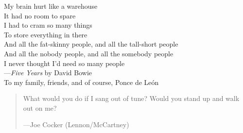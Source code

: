 \documentclass{ucbthesis}
\begin{document}
\begin{frontmatter}

\begin{dedication}
\begin{center}
\vfil\null
My brain hurt like a warehouse\\
It had no room to spare\\
I had to cram so many things\\
To store everything in there\\
And all the fat-skinny people, and all the tall-short people\\
And all the nobody people, and all the somebody people\\
I never thought I'd need so many people\\
\vspace{5 mm}
---\textit{Five Years} by David Bowie\\
\vspace{30 mm}
To my family, friends, and of course, Ponce de Le\'on\\
\end{center}
\end{dedication}

\tableofcontents

\begin{acknowledgements}

\begin{quotation}
What would you do if I sang out of tune? Would you stand up and walk out on me?
\begin{flushright}
 ---Joe Cocker (Lennon/McCartney)
\end{flushright}
\end{quotation}


\end{acknowledgements}
\end{frontmatter}
\end{document}
